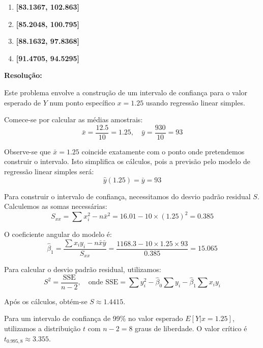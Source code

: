 \documentclass[a4paper,12pt]{article}
\begin{document}
\begin{enumerate}
    \vspace{0.3cm}

    \begin{enumerate}[label=\Alph*)]
        \item \textbf{[83.1367, 102.863]}
        \item \textbf{[85.2048, 100.795]}
        \item \textbf{[88.1632, 97.8368]}
        \item \textbf{[91.4705, 94.5295]}
    \end{enumerate}

    \vspace{0.3cm}

    \begin{mdframed}[backgroundcolor=gray!10,linewidth=0pt,innertopmargin=10pt,innerbottommargin=10pt]
    \textbf{Resolução:}

    Este problema envolve a construção de um intervalo de confiança para o valor esperado de $Y$ num ponto específico $x = 1.25$ usando regressão linear simples.

    Comece-se por calcular as médias amostrais:
    \[
    \bar{x} = \frac{12.5}{10} = 1.25, \quad \bar{y} = \frac{930}{10} = 93
    \]

    Observe-se que $\bar{x} = 1.25$ coincide exatamente com o ponto onde pretendemos construir o intervalo. Isto simplifica os cálculos, pois a previsão pelo modelo de regressão linear simples será:
    \[
    \hat{y}(1.25) = \bar{y} = 93
    \]

    Para construir o intervalo de confiança, necessitamos do desvio padrão residual $S$. Calculemos as somas necessárias:
    \[
    S_{xx} = \sum x_i^2 - n\bar{x}^2 = 16.01 - 10 \times (1.25)^2 = 0.385
    \]

    O coeficiente angular do modelo é:
    \[
    \hat{\beta}_1 = \frac{\sum x_i y_i - n\bar{x}\bar{y}}{S_{xx}} = \frac{1168.3 - 10 \times 1.25 \times 93}{0.385} = 15.065
    \]

    Para calcular o desvio padrão residual, utilizamos:
    \[
    S^2 = \frac{\text{SSE}}{n-2}, \quad \text{onde } \text{SSE} = \sum y_i^2 - \hat{\beta}_0 \sum y_i - \hat{\beta}_1 \sum x_i y_i
    \]

    Após os cálculos, obtém-se $S \approx 1.4415$.

    Para um intervalo de confiança de 99\% no valor esperado $E[Y|x = 1.25]$, utilizamos a distribuição $t$ com $n-2 = 8$ graus de liberdade. O valor crítico é $t_{0.995,8} \approx 3.355$.


\end{mdframed}
\end{enumerate}
\end{document}
